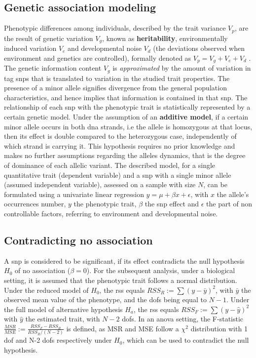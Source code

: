 \subsection{Genetic association modeling}
Phenotypic differences among individuals, described by the trait variance $V_p$,  are the result of genetic variation $V_g$, known as \textbf{heritability}, environmentally induced variation $V_e$ and developmental noise $V_d$ (the deviations observed when environment and genetics are controlled), formally denoted as $V_p=V_g+V_e+V_d$ \cite{Vogt2020}. The genetic information content $V_g$ is \textit{approximated} by the amount of variation in tag \acp{snp} that is translated to variation in the studied trait properties.  The presence of a minor allele signifies divergence from the general population characteristics, and hence implies that information is contained in that \ac{snp}.  The relationship of each \ac{snp} with the phenotypic trait is statistically represented by a certain genetic model. Under the assumption of an \textbf{additive model}, if a certain minor allele occurs in both \ac{dna} strands, i.e the allele is homozygous at that locus, then its effect is double compared to the heterozygous case, independently of which strand is carrying it. This hypothesis requires no prior knowledge and makes no further assumptions regarding the alleles dynamics, that is the degree of dominance of each allelic variant.  The described model, for a single quantitative trait (dependent variable) and a \ac{snp} with a single minor allele (assumed independent variable), assessed on a sample with size $N$, can be formulated using a univariate linear regression $y = \mu + \beta x + \epsilon$, with $x$ the allele's occurrences number, $y$ the phenotypic trait, $\beta$ the \ac{snp} effect and $\epsilon$ the part of non controllable factors, referring to environment and developmental noise. 

\subsection{Contradicting no association}
A \ac{snp} is considered to be significant, if its effect contradicts the null hypothesis $H_0$ of no association ($\beta=0$). For the subsequent analysis, under a biological setting, it is assumed that the phenotypic trait follows a normal distribution. Under the reduced model of $H_0$, the \ac{rss} equals $RSS_R:=\sum{(y-\bar{y})^2}$, with $\bar{y}$ the observed mean value of the phenotype, and the \acp{dof} being equal to $N-1$. Under the full model of alternative hypothesis $H_a$, the \ac{rss} equals $RSS_F:=\sum{(y-\hat{y})^2}$ with $\hat{y}$ the estimated trait, with $N-2$ \acp{dof}. In an \ac{anova} setting, the F-statistic $\frac{MSR}{MSE}:=\frac{RSS_F-RSS_R}{RSS_R/(N-2)}$ is defined, as MSR and MSE follow a $\chi^2$ distribution with 1 \ac{dof} and N-2 \acp{dof} respectively under $H_0$, which can be used to contradict the null hypothesis. 

